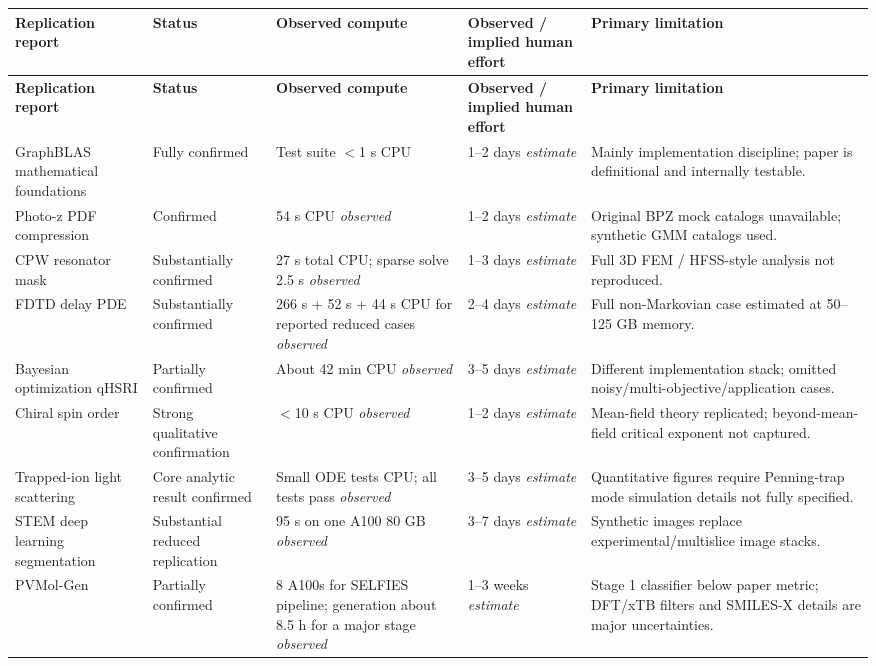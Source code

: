 \documentclass[11pt,letterpaper]{article}
\newcommand{\est}{\emph{estimate}}
\newcommand{\obs}{\emph{observed}}
\begin{document}
\begin{landscape}
\begin{longtable}{p{4.2cm}p{2.7cm}p{3.5cm}p{3.5cm}p{6.0cm}}
\toprule
\textbf{Replication report} & \textbf{Status} & \textbf{Observed compute} & \textbf{Observed / implied human effort} & \textbf{Primary limitation} \\
\midrule
\endfirsthead
\toprule
\textbf{Replication report} & \textbf{Status} & \textbf{Observed compute} & \textbf{Observed / implied human effort} & \textbf{Primary limitation} \\
\midrule
\endhead
GraphBLAS mathematical foundations & Fully confirmed & Test suite $<$1 s CPU & 1--2 days \est{} & Mainly implementation discipline; paper is definitional and internally testable. \\
\addlinespace
Photo-z PDF compression & Confirmed & 54 s CPU \obs{} & 1--2 days \est{} & Original BPZ mock catalogs unavailable; synthetic GMM catalogs used. \\
\addlinespace
CPW resonator mask & Substantially confirmed & 27 s total CPU; sparse solve 2.5 s \obs{} & 1--3 days \est{} & Full 3D FEM / HFSS-style analysis not reproduced. \\
\addlinespace
FDTD delay PDE & Substantially confirmed & 266 s + 52 s + 44 s CPU for reported reduced cases \obs{} & 2--4 days \est{} & Full non-Markovian case estimated at 50--125 GB memory. \\
\addlinespace
Bayesian optimization qHSRI & Partially confirmed & About 42 min CPU \obs{} & 3--5 days \est{} & Different implementation stack; omitted noisy/multi-objective/application cases. \\
\addlinespace
Chiral spin order & Strong qualitative confirmation & $<$10 s CPU \obs{} & 1--2 days \est{} & Mean-field theory replicated; beyond-mean-field critical exponent not captured. \\
\addlinespace
Trapped-ion light scattering & Core analytic result confirmed & Small ODE tests CPU; all tests pass \obs{} & 3--5 days \est{} & Quantitative figures require Penning-trap mode simulation details not fully specified. \\
\addlinespace
STEM deep learning segmentation & Substantial reduced replication & 95 s on one A100 80 GB \obs{} & 3--7 days \est{} & Synthetic images replace experimental/multislice image stacks. \\
\addlinespace
PVMol-Gen & Partially confirmed & 8 A100s for SELFIES pipeline; generation about 8.5 h for a major stage \obs{} & 1--3 weeks \est{} & Stage 1 classifier below paper metric; DFT/xTB filters and SMILES-X details are major uncertainties. \\

\end{longtable}
\end{landscape}
\end{document}
